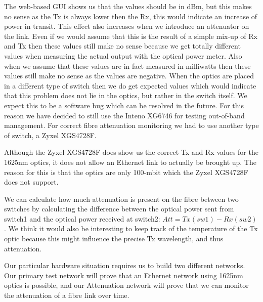 \documentclass{article}
\begin{document}
The web-based GUI shows us that the values should be in dBm, but this makes no sense as the Tx is always lower then the Rx, this would indicate an increase of power in transit. This effect also increases when we introduce an attenuator on the link. Even if we would assume that this is the result of a simple mix-up of Rx and Tx then these values still make no sense because we get totally different values when measuring the actual output with the optical power meter. Also when we assume that these values are in fact measured in milliwatts then these values still make no sense as the values are negative. When the optics are placed in a different type of switch then we do get expected values which would indicate that this problem does not lie in the optics, but rather in the switch itself. We expect this to be a software bug which can be resolved in the future. For this reason we have decided to still use the Inteno XG6746 for testing out-of-band management. For correct fibre attenuation monitoring we had to use another type of switch, a Zyxel XGS4728F.

Although the Zyxel XGS4728F does show us the correct Tx and Rx values for the 1625nm optics, it does not allow an Ethernet link to actually be brought up. The reason for this is that the optics are only 100-mbit which the Zyxel XGS4728F does not support. 

We can calculate how much attenuation is present on the fibre between two switches by calculating the difference between the optical power sent from switch1 and the optical power received at switch2: $Att=Tx(sw1)-Rx(sw2)$. We think it would also be interesting to keep track of the temperature of the Tx optic because this might influence the precise Tx wavelength, and thus attenuation.

Our particular hardware situation requires us to build two different networks. Our primary test network will prove that an Ethernet network using 1625nm optics is possible, and our Attenuation network will prove that we can monitor the attenuation of a fibre link over time.
\newpage
\end{document}
